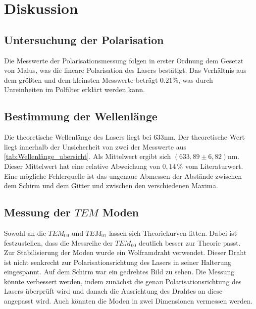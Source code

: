 \section{Diskussion}
\label{sec:Diskussion}



\subsection{Untersuchung der Polarisation}
\label{sec:Polarisation}

Die Messwerte der Polarisationsmessung folgen in erster Ordnung dem Gesetzt von Malus, was die lineare Polarisation des Lasers bestätigt.
Das Verhältnis aus dem größten und dem kleinsten Messwerte beträgt $0.21 \% $, was durch Unreinheiten im Polfilter erklärt werden kann.

\subsection{Bestimmung der Wellenlänge}
\label{sec:Wellenlänge}

Die theoretische Wellenlänge des Lasers liegt bei $633 \unit{\nano\meter}$\cite{eicheich}. Der theoretische Wert liegt innerhalb der Unsicherheit von zwei der Messwerte aus \autoref{tab:Wellenlänge_ubersicht}.
Als Mittelwert ergibt sich $ \left( 633,89 \pm 6,82 \right) \unit{\nano\meter}$. Dieser Mittelwert hat eine relative Abweichung von $ 0,14 \,\% $ vom Literaturwert.
Eine mögliche Fehlerquelle ist das ungenaue Abmessen der Abstände zwischen dem Schirm und dem Gitter und zwischen den verschiedenen Maxima. 


\subsection{Messung der $TEM$ Moden}
\label{sec:TEM_moden}
Sowohl an die $TEM_{00}$ und $TEM_{01}$ lassen sich Theoriekurven fitten. Dabei ist festzustellen, dass die Messreihe der $TEM_{00}$ deutlich besser zur Theorie passt.
Zur Stabilisierung der Moden wurde ein Wolframdraht verwendet. Dieser Draht ist nicht senkrecht zur Polarisationsrichtung des Lasers in seiner Halterung eingespannt.
Auf dem Schirm war ein gedrehtes Bild zu sehen. Die Messung könnte verbessert werden, indem zunächst die genau Polarisationsrichtung des Lasers überprüft wird und danach die Ausrichtung des Drahtes an diese angepasst wird.    
Auch könnten die Moden in zwei Dimensionen vermessen werden.

